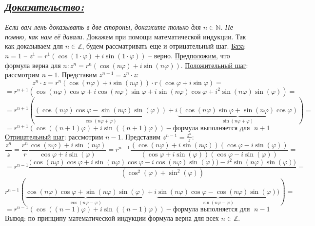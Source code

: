 \documentclass{article}
\begin{document}
\subsection*{\Large \underline{\textit{Доказательство: }}}
\textit{Если вам лень доказывать в две стороны, докажите только для $n \in \mathbb{N}$. Не помню, как нам её давали.}
\newline Докажем при помощи математической индукции. Так как доказываем для $n \in \mathbb{Z}$, будем рассматривать еще и отрицательный шаг.
\newline \underline{База}: $n = 1$ -- $z^1 = r^1(\cos{(1\cdot\varphi)} + i\sin{(1\cdot\varphi)})$ -- верно.
\newline \underline{Предположим}, что формула верна для $n: z^n =  r^n(\cos{(n\varphi)} + i\sin{(n\varphi)})$.
\newline \underline{Положительный шаг}: рассмотрим $n + 1$. Представим $z^{n + 1} = z^n \cdot z$:
$$ z^n \cdot z =  r^n(\cos{(n\varphi)} + i\sin{(n\varphi)})\cdot r(\cos{\varphi} + i\sin{\varphi}) = $$
$$ = r^{n + 1}(\cos{(n\varphi)}\cos{\varphi} + i\cos{(n\varphi)}\sin{\varphi} + i\sin{(n\varphi)}\cos{\varphi} + i^2\sin{(n\varphi)}\sin{(\varphi)}) = $$
$$ = r^{n + 1}(\underbrace{(\cos{(n\varphi)}\cos{\varphi} - \sin{(n\varphi)}\sin{(\varphi)})}_{\cos{(n\varphi + \varphi)}} + i\underbrace{(\cos{(n\varphi)}\sin{\varphi} + \sin{(n\varphi)}\cos{\varphi})}_{\sin{(n\varphi + \varphi)}}) = $$
$$ = r^{n + 1}(\cos{((n + 1)\varphi)} + i\sin{((n+1)\varphi)}) - \mbox{формула выполняется для }\; n+1 $$
\newline \underline{Отрицательный шаг}: рассмотрим $n - 1$. Представим $z^{n - 1} = \frac{z^n}{z}$:
$$ \frac{z^n}{z} = \frac{r^n}{r}\frac{\cos{(n\varphi)} + i\sin{(n\varphi)}}{\cos{\varphi} + i\sin{(\varphi)}} = r^{n - 1}\frac{(\cos{(n\varphi)} + i\sin{(n\varphi)})(\cos{\varphi} - i\sin{(\varphi)})}{(\cos{\varphi} + i\sin{(\varphi)})(\cos{\varphi} - i\sin{(\varphi)})} = $$
$$ = r^{n - 1}\frac{(\cos{(n\varphi)}\cos{\varphi} + i\sin{(n\varphi)}\cos{\varphi} - i\cos{(n\varphi)}\sin{(\varphi))} - i^2\sin{(n\varphi)}\sin{(\varphi))}}{(\cos^2{(\varphi)} + \sin^2{(\varphi)})} = $$
$$ r^{n - 1}(\underbrace{\cos{(n\varphi)}\cos{\varphi} + \sin{(n\varphi)}\sin{(\varphi)}}_{\cos{(n\varphi - \varphi)}} + i\underbrace{\sin{(n\varphi)}\cos{\varphi} - \cos{(n\varphi)}\sin{(\varphi))}}_{\sin{(n\varphi - \varphi)}}) = $$
$$ = r^{n - 1}(\cos{((n - 1)\varphi)} + i\sin{((n - 1)\varphi)}) - \mbox{формула выполняется для }\; n-1 $$
Вывод: по принципу математической индукции формула верна для всех $n \in \mathbb{Z}$.
\end{document}
